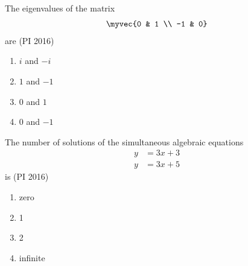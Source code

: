 \item The eigenvalues of the matrix
\begin{align*}
\myvec{0 & 1 \\ -1 & 0}
\end{align*}
are  
\hfill{(PI 2016)}
\begin{multicols}{4}
\begin{enumerate}
    \item $i$ and $-i$
    \item $1$ and $-1$
    \item $0$ and $1$
    \item $0$ and $-1$
\end{enumerate}
\end{multicols}
\item The number of solutions of the simultaneous algebraic equations 
\begin{align*}
	y &= 3x+3 \\
	y&=3x+5
\end{align*}
is  
\hfill{(PI 2016)}
\begin{multicols}{4}
\begin{enumerate}
    \item zero
    \item 1
    \item 2
    \item infinite
\end{enumerate}
\end{multicols}

